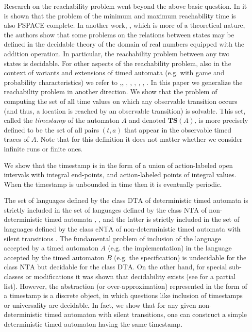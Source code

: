 \documentclass[11pt]{amsart}
\theoremstyle{definition}
\newcommand{\TTTSSS}{\mathbf{TS}}
\newcommand{\dta}{\mathrm{DTA}}
\newcommand{\nta}{\mathrm{NTA}}
\newcommand{\ntaeps}{\mathrm{eNTA}}
\begin{document}
Research on the reachability problem went beyond the above basic question.
In \cite{CY92} it is shown that the problem of the minimum and maximum reachability time is also PSPACE-complete.
In another work, \cite{CJ99}, which is more of a theoretical nature, the authors show that some problems on the relations between states may be defined in the decidable theory of the domain of real numbers equipped with the addition operation.
In particular, the reachability problem between any two states is decidable.
For other aspects of the reachability problem, also in the context of variants and extensions of timed automata (e.g. with game and probability characteristics) we refer to \cite{CY92},\cite{member-ta-ha}, \cite{TY01},  \cite{WZP03}, \cite{control_ta}, \cite{HP06}, \cite{CHKM11}, \cite{HOW12}.
In this paper we generalize the reachability problem in another direction.
We show that the problem of computing the set of all time values on which any observable transition occurs (and thus, a location is reached by an observable transition) is solvable.
This set, called the \emph{timestamp} of the automaton $A$ and denoted $\TTTSSS(A)$, is more precisely defined to be the set of all pairs $(t, a)$ that appear in the observable timed traces of $A$.
Note that for this definition it does not matter whether we consider infinite runs or finite ones.

We show that the timestamp is in the form of a union of action-labeled open intervals with integral end-points, and action-labeled points of integral values.
When the timestamp is unbounded in time then it is eventually periodic.
 
The set of languages defined by the class $\dta$ of deterministic timed automata is strictly included in the set of languages defined by the class $\nta$ of non-deterministic timed automata \cite{ta}, \cite{Finkel06}, and the latter is strictly included in the set of languages defined by the class $\ntaeps$ of non-deterministic timed automata with silent transitions \cite{ta-eps}.
The fundamental problem of inclusion of the language accepted by a timed automaton $A$ (e.g. the implementation) in the language accepted by the timed automaton $B$ (e.g. the specification) is undecidable for the class $\nta$ but decidable for the class $\dta$.
On the other hand, for special sub-classes or modifications it was shown that decidability exists (see \cite{bbbb,ta-eps,era,updatable-ta,Ouak_one_clk,Ouak_time_bound,bounded-time,Dec_TA_Survey,bound-det} for a partial list).
However, the abstraction (or over-approximation) represented in the form of a timestamp is a discrete object, in which questions like inclusion of timestamps or universality are decidable.
In fact, we show that for any given non-deterministic timed automaton with silent transitions, one can construct a simple deterministic timed automaton having the same timestamp. 
\end{document}
